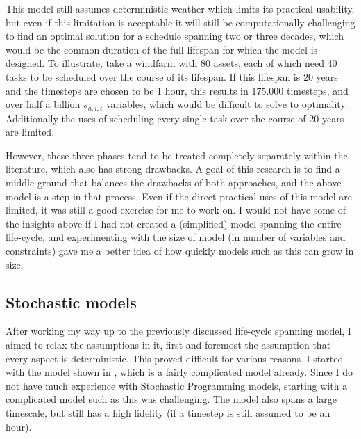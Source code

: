 \documentclass[a4paper,12pt]{article}
\begin{document}
This model still assumes deterministic weather which limits its practical usability, but even if this limitation is acceptable it will still be computationally challenging to find an optimal solution for a schedule spanning two or three decades, which would be the common duration of the full lifespan for which the model is designed. To illustrate, take a windfarm with 80 assets, each of which need 40 tasks to be scheduled over the course of its lifespan. If this lifespan is 20 years and the timesteps are chosen to be 1 hour, this results in 175.000 timesteps, and over half a billion $s_{a,i,t}$ variables, which would be difficult to solve to optimality. Additionally the uses of scheduling every single task over the course of 20 years are limited. 

However, these three phases tend to be treated completely separately within the literature, which also has strong drawbacks. A goal of this research is to find a middle ground that balances the drawbacks of both approaches, and the above model is a step in that process. Even if the direct practical uses of this model are limited, it was still a good exercise for me to work on. I would not have some of the insights above if I had not created a (simplified) model spanning the entire life-cycle, and experimenting with the size of model (in number of variables and constraints) gave me a better idea of how quickly models such as this can grow in size. 

\subsection{Stochastic models}
After working my way up to the previously discussed life-cycle spanning model, I aimed to relax the assumptions in it, first and foremost the assumption that every aspect is deterministic. This proved difficult for various reasons. I started with the model shown in , which is a fairly complicated model already. Since I do not have much experience with Stochastic Programming models, starting with a complicated model such as this was challenging. The model also spans a large timescale, but still has a high fidelity (if a timestep is still assumed to be an hour). 
\end{document}
